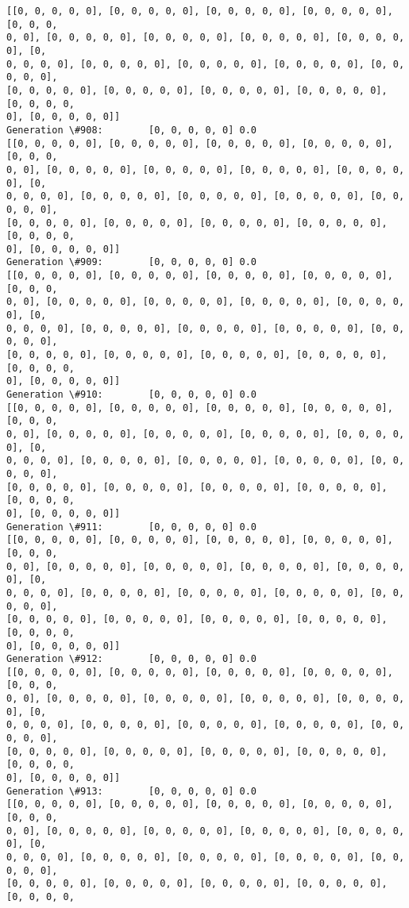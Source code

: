 \documentclass[11pt]{article}
\begin{document}
\begin{Verbatim}[commandchars=\\\{\}]
[[0, 0, 0, 0, 0], [0, 0, 0, 0, 0], [0, 0, 0, 0, 0], [0, 0, 0, 0, 0], [0, 0, 0,
0, 0], [0, 0, 0, 0, 0], [0, 0, 0, 0, 0], [0, 0, 0, 0, 0], [0, 0, 0, 0, 0], [0,
0, 0, 0, 0], [0, 0, 0, 0, 0], [0, 0, 0, 0, 0], [0, 0, 0, 0, 0], [0, 0, 0, 0, 0],
[0, 0, 0, 0, 0], [0, 0, 0, 0, 0], [0, 0, 0, 0, 0], [0, 0, 0, 0, 0], [0, 0, 0, 0,
0], [0, 0, 0, 0, 0]]
Generation \#908:        [0, 0, 0, 0, 0] 0.0
[[0, 0, 0, 0, 0], [0, 0, 0, 0, 0], [0, 0, 0, 0, 0], [0, 0, 0, 0, 0], [0, 0, 0,
0, 0], [0, 0, 0, 0, 0], [0, 0, 0, 0, 0], [0, 0, 0, 0, 0], [0, 0, 0, 0, 0], [0,
0, 0, 0, 0], [0, 0, 0, 0, 0], [0, 0, 0, 0, 0], [0, 0, 0, 0, 0], [0, 0, 0, 0, 0],
[0, 0, 0, 0, 0], [0, 0, 0, 0, 0], [0, 0, 0, 0, 0], [0, 0, 0, 0, 0], [0, 0, 0, 0,
0], [0, 0, 0, 0, 0]]
Generation \#909:        [0, 0, 0, 0, 0] 0.0
[[0, 0, 0, 0, 0], [0, 0, 0, 0, 0], [0, 0, 0, 0, 0], [0, 0, 0, 0, 0], [0, 0, 0,
0, 0], [0, 0, 0, 0, 0], [0, 0, 0, 0, 0], [0, 0, 0, 0, 0], [0, 0, 0, 0, 0], [0,
0, 0, 0, 0], [0, 0, 0, 0, 0], [0, 0, 0, 0, 0], [0, 0, 0, 0, 0], [0, 0, 0, 0, 0],
[0, 0, 0, 0, 0], [0, 0, 0, 0, 0], [0, 0, 0, 0, 0], [0, 0, 0, 0, 0], [0, 0, 0, 0,
0], [0, 0, 0, 0, 0]]
Generation \#910:        [0, 0, 0, 0, 0] 0.0
[[0, 0, 0, 0, 0], [0, 0, 0, 0, 0], [0, 0, 0, 0, 0], [0, 0, 0, 0, 0], [0, 0, 0,
0, 0], [0, 0, 0, 0, 0], [0, 0, 0, 0, 0], [0, 0, 0, 0, 0], [0, 0, 0, 0, 0], [0,
0, 0, 0, 0], [0, 0, 0, 0, 0], [0, 0, 0, 0, 0], [0, 0, 0, 0, 0], [0, 0, 0, 0, 0],
[0, 0, 0, 0, 0], [0, 0, 0, 0, 0], [0, 0, 0, 0, 0], [0, 0, 0, 0, 0], [0, 0, 0, 0,
0], [0, 0, 0, 0, 0]]
Generation \#911:        [0, 0, 0, 0, 0] 0.0
[[0, 0, 0, 0, 0], [0, 0, 0, 0, 0], [0, 0, 0, 0, 0], [0, 0, 0, 0, 0], [0, 0, 0,
0, 0], [0, 0, 0, 0, 0], [0, 0, 0, 0, 0], [0, 0, 0, 0, 0], [0, 0, 0, 0, 0], [0,
0, 0, 0, 0], [0, 0, 0, 0, 0], [0, 0, 0, 0, 0], [0, 0, 0, 0, 0], [0, 0, 0, 0, 0],
[0, 0, 0, 0, 0], [0, 0, 0, 0, 0], [0, 0, 0, 0, 0], [0, 0, 0, 0, 0], [0, 0, 0, 0,
0], [0, 0, 0, 0, 0]]
Generation \#912:        [0, 0, 0, 0, 0] 0.0
[[0, 0, 0, 0, 0], [0, 0, 0, 0, 0], [0, 0, 0, 0, 0], [0, 0, 0, 0, 0], [0, 0, 0,
0, 0], [0, 0, 0, 0, 0], [0, 0, 0, 0, 0], [0, 0, 0, 0, 0], [0, 0, 0, 0, 0], [0,
0, 0, 0, 0], [0, 0, 0, 0, 0], [0, 0, 0, 0, 0], [0, 0, 0, 0, 0], [0, 0, 0, 0, 0],
[0, 0, 0, 0, 0], [0, 0, 0, 0, 0], [0, 0, 0, 0, 0], [0, 0, 0, 0, 0], [0, 0, 0, 0,
0], [0, 0, 0, 0, 0]]
Generation \#913:        [0, 0, 0, 0, 0] 0.0
[[0, 0, 0, 0, 0], [0, 0, 0, 0, 0], [0, 0, 0, 0, 0], [0, 0, 0, 0, 0], [0, 0, 0,
0, 0], [0, 0, 0, 0, 0], [0, 0, 0, 0, 0], [0, 0, 0, 0, 0], [0, 0, 0, 0, 0], [0,
0, 0, 0, 0], [0, 0, 0, 0, 0], [0, 0, 0, 0, 0], [0, 0, 0, 0, 0], [0, 0, 0, 0, 0],
[0, 0, 0, 0, 0], [0, 0, 0, 0, 0], [0, 0, 0, 0, 0], [0, 0, 0, 0, 0], [0, 0, 0, 0,

\end{Verbatim}
\end{document}
